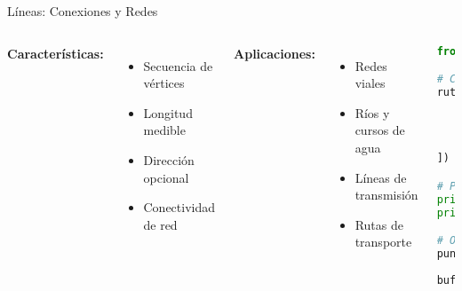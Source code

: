 \documentclass[10pt]{beamer}
\begin{document}
\begin{frame}[fragile]{Líneas: Conexiones y Redes}
    \begin{columns}
        \textbf{Características:}
        \begin{itemize}
            \item Secuencia de vértices
            \item Longitud medible
            \item Dirección opcional
            \item Conectividad de red
        \end{itemize}
        
        \textbf{Aplicaciones:}
        \begin{itemize}
            \item Redes viales
            \item Ríos y cursos de agua
            \item Líneas de transmisión
            \item Rutas de transporte
        \end{itemize}
        
        \begin{lstlisting}[language=Python, caption=Análisis de líneas]
from shapely.geometry import LineString

# Crear línea
ruta = LineString([
    (-70.651, -33.438),
    (-70.649, -33.437),
    (-70.648, -33.439),
    (-70.650, -33.441)
])

# Propiedades
print(f"Longitud: {ruta.length}")
print(f"Vertices: {len(ruta.coords)}")

# Operaciones
punto_medio = ruta.interpolate(0.5, 
                               normalized=True)
buffer_ruta = ruta.buffer(0.001)
        \end{lstlisting}
    \end{columns}
\end{frame}
\end{document}
